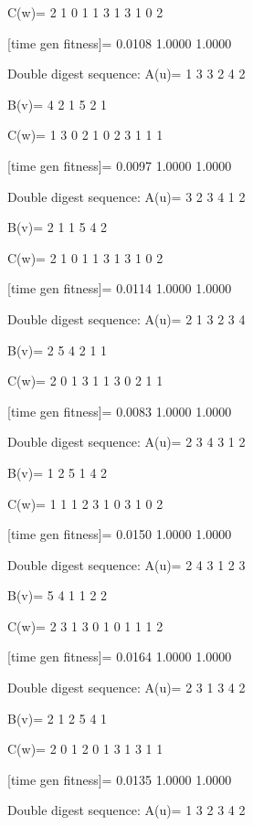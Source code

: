 C(w)=
     2     1     0     1     1     3     1     3     1     0     2

[time gen fitness]=
    0.0108    1.0000    1.0000

Double digest sequence:
A(u)=
     1     3     3     2     4     2

B(v)=
     4     2     1     5     2     1

C(w)=
     1     3     0     2     1     0     2     3     1     1     1

[time gen fitness]=
    0.0097    1.0000    1.0000

Double digest sequence:
A(u)=
     3     2     3     4     1     2

B(v)=
     2     1     1     5     4     2

C(w)=
     2     1     0     1     1     3     1     3     1     0     2

[time gen fitness]=
    0.0114    1.0000    1.0000

Double digest sequence:
A(u)=
     2     1     3     2     3     4

B(v)=
     2     5     4     2     1     1

C(w)=
     2     0     1     3     1     1     3     0     2     1     1

[time gen fitness]=
    0.0083    1.0000    1.0000

Double digest sequence:
A(u)=
     2     3     4     3     1     2

B(v)=
     1     2     5     1     4     2

C(w)=
     1     1     1     2     3     1     0     3     1     0     2

[time gen fitness]=
    0.0150    1.0000    1.0000

Double digest sequence:
A(u)=
     2     4     3     1     2     3

B(v)=
     5     4     1     1     2     2

C(w)=
     2     3     1     3     0     1     0     1     1     1     2

[time gen fitness]=
    0.0164    1.0000    1.0000

Double digest sequence:
A(u)=
     2     3     1     3     4     2

B(v)=
     2     1     2     5     4     1

C(w)=
     2     0     1     2     0     1     3     1     3     1     1

[time gen fitness]=
    0.0135    1.0000    1.0000

Double digest sequence:
A(u)=
     1     3     2     3     4     2


